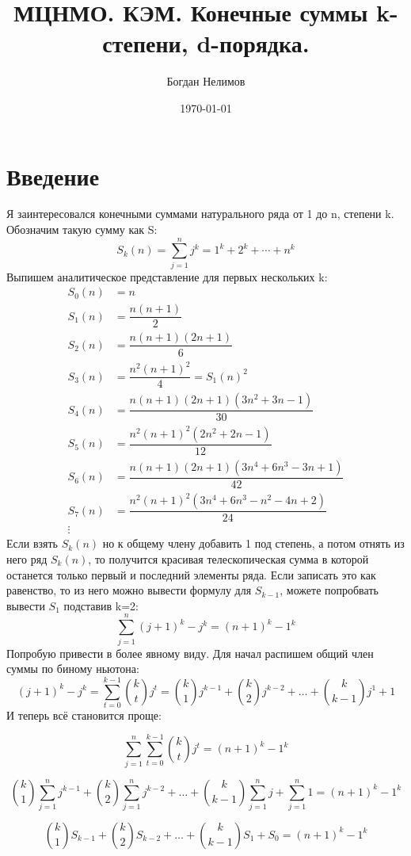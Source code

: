 \documentclass{article} %
\title{МЦНМО. КЭМ. Конечные суммы k-степени, d-порядка.}
\author{Богдан Нелимов}
\date{\today}
\begin{document}
	
	\maketitle
	\newpage
	
	\section{Введение}{Я заинтересовался конечными суммами натурального ряда от 1 до n, степени k. Обозначим такую сумму как S: 
		$$S_k(n) = \sum_{j=1}^{n}j^k = 1^k + 2^k + \cdots + n^k$$
		Выпишем аналитическое представление для первых нескольких k:
		\begin{align*}
			S_0(n) &= n\\
			S_1(n) &= \dfrac{n(n+1)}{2}\\
			S_2(n) &= \dfrac{n(n+1)(2n+1)}{6}\\
			S_3(n) &= \dfrac{n^2(n+1)^2}{4} = S_1(n)^2\\
			S_4(n) &= \dfrac{n(n+1)(2n+1)(3n^2 + 3n - 1)}{30}\\
			S_5(n) &= \dfrac{n^2(n+1)^2(2n^2+2n-1)}{12}\\
			S_6(n) &= \dfrac{n(n+1)(2n+1)(3n^4+6n^3-3n+1)}{42}\\
			S_7(n) &= \dfrac{n^2(n+1)^2(3n^4+6n^3-n^2-4n+2)}{24}\\
			\vdots
		\end{align*}
		Если взять $S_k(n)$ но к общему члену добавить 1 под степень, а потом отнять из него ряд $S_k(n)$, то получится красивая телескопическая сумма в которой останется только первый и последний элементы ряда. Если записать это как равенство, то из него можно вывести формулу для $S_{k-1}$, можете попробвать вывести $S_1$ подставив k=2:
		$$\sum_{j=1}^{n}(j+1)^k - j^k = (n+1)^k - 1^k$$
		Попробую привести в более явному виду. Для начал распишем общий член суммы по биному ньютона:
		$$(j+1)^k - j^k = \sum_{t=0}^{k-1}{{k}\choose{t}}j^t = {{k}\choose{1}}j^{k-1} + {{k}\choose{2}}j^{k-2} + \ldots + {{k}\choose{k-1}}j^{1} + 1$$
		И теперь всё становится проще:
		
		$$\sum_{j=1}^{n}\sum_{t=0}^{k-1}{{k}\choose{t}}j^t = (n+1)^k - 1^k$$
		
		$${{k}\choose{1}}\sum_{j=1}^{n}j^{k-1} + {{k}\choose{2}}\sum_{j=1}^{n}j^{k-2} + \ldots + {{k}\choose{k-1}}\sum_{j=1}^{n}j + \sum_{j=1}^{n}1 = (n+1)^k - 1^k$$
		
		$${{k}\choose{1}}S_{k-1} + {{k}\choose{2}}S_{k-2} + \ldots + {{k}\choose{k-1}}S_{1} + S_{0} = (n+1)^k - 1^k$$
		
}
\end{document}
